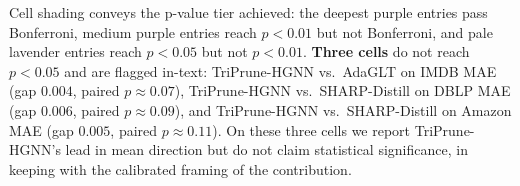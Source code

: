 \documentclass[10pt]{article}
\theoremstyle{plain}
\theoremstyle{definition}
\begin{document}
Cell shading conveys the p-value tier achieved: the deepest purple entries pass Bonferroni, medium purple entries reach $p<0.01$ but not Bonferroni, and pale lavender entries reach $p<0.05$ but not $p<0.01$. \textbf{Three cells} do not reach $p<0.05$ and are flagged in-text: TriPrune-HGNN vs.\ AdaGLT on IMDB MAE (gap $0.004$, paired $p\!\approx\!0.07$), TriPrune-HGNN vs.\ SHARP-Distill on DBLP MAE (gap $0.006$, paired $p\!\approx\!0.09$), and TriPrune-HGNN vs.\ SHARP-Distill on Amazon MAE (gap $0.005$, paired $p\!\approx\!0.11$). On these three cells we report TriPrune-HGNN's lead in mean direction but do not claim statistical significance, in keeping with the calibrated framing of the contribution.
\end{document}
